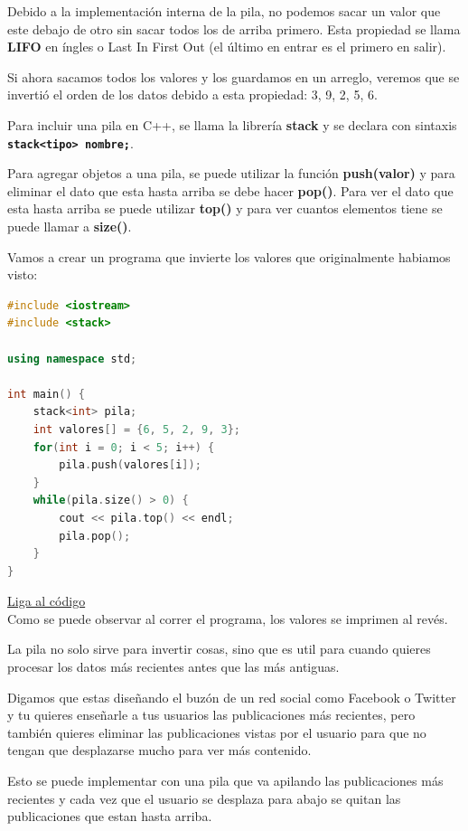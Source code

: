 \documentclass{article}
\begin{document}
Debido a la implementación interna de la pila, no podemos sacar un valor que este debajo de otro sin sacar todos los de arriba primero. Esta propiedad se llama \textbf{LIFO} en íngles o Last In First Out (el último en entrar es el primero en salir).

Si ahora sacamos todos los valores y los guardamos en un arreglo, veremos que se invertió el orden de los datos debido a esta propiedad: {3, 9, 2, 5, 6}.

Para incluir una pila en C++, se llama la librería \textbf{stack} y se declara con sintaxis \textbf{\lstinline{stack<tipo> nombre;}}.

Para agregar objetos a una pila, se puede utilizar la función \textbf{push(valor)} y para eliminar el dato que esta hasta arriba se debe hacer \textbf{pop()}. Para ver el dato que esta hasta arriba se puede utilizar \textbf{top()} y para ver cuantos elementos tiene se puede llamar a \textbf{size()}.

Vamos a crear un programa que invierte los valores que originalmente habiamos visto:

\begin{lstlisting}[language=C++, title=Pilas]
#include <iostream>
#include <stack>

using namespace std;

int main() {
	stack<int> pila;
	int valores[] = {6, 5, 2, 9, 3};
	for(int i = 0; i < 5; i++) {
		pila.push(valores[i]);
	}
	while(pila.size() > 0) {
		cout << pila.top() << endl;
		pila.pop();
	}
}
\end{lstlisting}
\href{https://repl.it/@Jamesscn/Cargando-pilas}{Liga al código} \\

Como se puede observar al correr el programa, los valores se imprimen al revés.

La pila no solo sirve para invertir cosas, sino que es util para cuando quieres procesar los datos más recientes antes que las más antiguas.

Digamos que estas diseñando el buzón de un red social como Facebook o Twitter y tu quieres enseñarle a tus usuarios las publicaciones más recientes, pero también quieres eliminar las publicaciones vistas por el usuario para que no tengan que desplazarse mucho para ver más contenido.

Esto se puede implementar con una pila que va apilando las publicaciones más recientes y cada vez que el usuario se desplaza para abajo se quitan las publicaciones que estan hasta arriba.
\end{document}
